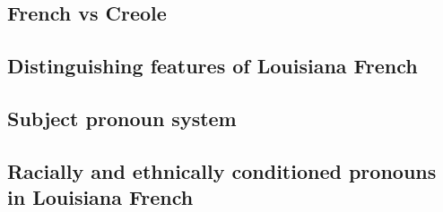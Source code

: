     \subsection{French vs Creole}
    \subsection{Distinguishing features of Louisiana French}
    \subsection{Subject pronoun system}
    \subsection{Racially and ethnically conditioned pronouns in Louisiana French} %




